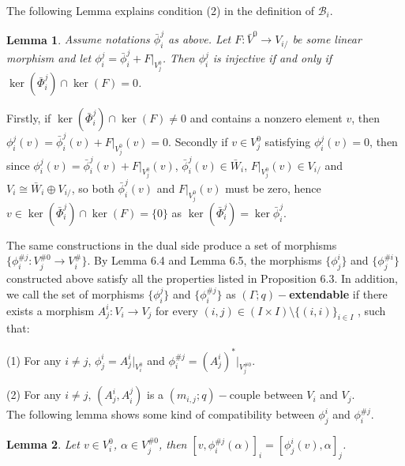 \def\CTEXPreproc{Created by ctex v0.2.12, don't edit!}\documentclass[11pt]{article}
\newtheorem{lem}{Lemma}[section]
\begin{document}
  The following Lemma explains condition (2) in the definition of $\mathscr{B}_i$.

  \begin{lem} Assume notations $\bar{\phi}^j _i $ as above. Let $F: \bar{V}^0 \rightarrow V_{i/}$ be some linear morphism and let
  $\phi^j _i = \bar{\phi}^j _i + F|_{V^0 _j }$. Then $\phi^j _i$ is injective if and only if $\ker( \bar{\Phi}^j _i )\cap \ker(F)=0 $.
  \end{lem}

  \begin{pf} Firstly, if $\ker( \bar{\Phi}^j _i )\cap \ker(F)\neq 0 $ and contains a nonzero element $v$, then
  $\phi^j _i (v)= \bar{\phi}^j _i (v) + F|_{V^0 _j }(v) =0  $. Secondly if $v\in V^0 _j $ satisfying $\phi^j _i (v)=0 $, then
  since $\phi^j _i(v) = \bar{\phi}^j _i (v) + F|_{V^0 _j }(v)   $, $\bar{\phi}^j _i (v)\in \bar{W}_i   $, $ F|_{V^0 _j }(v) \in V_{i/}  $ and $V_i \cong \bar{W}_i \oplus V_{i/}$, so both $ \bar{\phi}^j _i (v)  $ and $F|_{V^0 _j }(v)   $ must be zero, hence
  $ v\in \ker( \bar{\Phi}^j _i )\cap \ker(F)=\{ 0\}  $ as $ \ker( \bar{\Phi}^j _i )= \ker{\bar{\phi}}^j _i $. \\

  \end{pf}

 The same constructions in the dual side produce a set of morphisms $\{ \phi^{\# j} _i : V^{\# 0}_j \rightarrow V^{\#}_i  \}   $.  By Lemma 6.4 and Lemma 6.5, the morphisms $\{ \phi^i _j \}$ and  $\{ \phi^{\# i} _j \}$ constructed above satisfy all the properties listed in Proposition 6.3.  In addition, we call the set of morphisms
  $\{ \phi^j _i \} $ and $\{  \phi^{\# j} _i \}$ as \textbf{$( \Gamma; q )-$extendable} if  there exists a morphism $A^i _j : V_i \rightarrow V_j  $ for every $  (i,j)\in (I \times I )  \setminus \{ (i,i)\}_{i\in I}$  , such that:

 \noindent (1) For any $i\neq j$, $\phi^i _j = A^i _j |_{V^0 _i }  $ and $ \phi^{\# j}_i = ( A^i _j   )^{*} | _{ V^{\# 0}_j  }  $.

 \noindent (2)  For any $i\neq j$, $( A^i _j , A^j _i  )$ is a $( m_{i,j} ;q )-$couple between $V_i$ and $V_j$.\\


The following lemma shows some kind of compatibility between $\phi^i _j$ and $\phi^{\# j}_i $.


\begin{lem} Let $v\in V^0 _i $, $\alpha \in V^{\# 0}_j $, then
 $[  v, \phi^{\# j} _i (\alpha )   ]_i = [ \phi^i _j (v) ,\alpha    ]_j   $.

\end{lem}
\end{document}
